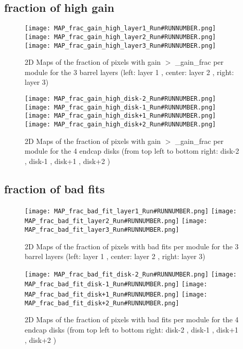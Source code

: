 \documentclass[a4paper,10pt]{article}
\begin{document}
\pagebreak



\subsection{fraction of high gain}

\begin{figure}[htp]
 \centering
\subfigure
 {\texttt{[image: MAP\_frac\_gain\_high\_layer1\_Run\#RUNNUMBER.png]}}
\subfigure
 {\texttt{[image: MAP\_frac\_gain\_high\_layer2\_Run\#RUNNUMBER.png]}}
\subfigure
 {\texttt{[image: MAP\_frac\_gain\_high\_layer3\_Run\#RUNNUMBER.png]}}
\caption{2D Maps of the fraction of pixels with gain $>$ \high_gain_frac per module for the 3 barrel layers (left: layer 1 , center: layer 2 , right: layer 3)}
\end{figure}

\begin{figure}[htp]
 \centering
\subfigure
 {\texttt{[image: MAP\_frac\_gain\_high\_disk-2\_Run\#RUNNUMBER.png]}}
\subfigure
 {\texttt{[image: MAP\_frac\_gain\_high\_disk-1\_Run\#RUNNUMBER.png]}}
\subfigure
 {\texttt{[image: MAP\_frac\_gain\_high\_disk+1\_Run\#RUNNUMBER.png]}}
\subfigure
 {\texttt{[image: MAP\_frac\_gain\_high\_disk+2\_Run\#RUNNUMBER.png]}}
\caption{2D Maps of the fraction of pixels with gain $>$ \high_gain_frac per module for the 4 endcap disks (from top left to bottom right: disk-2 , disk-1 , disk+1 , disk+2 )}
\end{figure}

\pagebreak


\subsection{fraction of bad fits}

\begin{figure}[htp]
 \centering
\subfigure
 {\texttt{[image: MAP\_frac\_bad\_fit\_layer1\_Run\#RUNNUMBER.png]}}
\subfigure
 {\texttt{[image: MAP\_frac\_bad\_fit\_layer2\_Run\#RUNNUMBER.png]}}
\subfigure
 {\texttt{[image: MAP\_frac\_bad\_fit\_layer3\_Run\#RUNNUMBER.png]}}
\caption{2D Maps of the fraction of pixels with bad fits per module for the 3 barrel layers (left: layer 1 , center: layer 2 , right: layer 3)}
\end{figure}

\begin{figure}[htp]
 \centering
\subfigure
 {\texttt{[image: MAP\_frac\_bad\_fit\_disk-2\_Run\#RUNNUMBER.png]}}
\subfigure
 {\texttt{[image: MAP\_frac\_bad\_fit\_disk-1\_Run\#RUNNUMBER.png]}}
\subfigure
 {\texttt{[image: MAP\_frac\_bad\_fit\_disk+1\_Run\#RUNNUMBER.png]}}
\subfigure
 {\texttt{[image: MAP\_frac\_bad\_fit\_disk+2\_Run\#RUNNUMBER.png]}}
\caption{2D Maps of the fraction of pixels with bad fits per module for the 4 endcap disks (from top left to bottom right: disk-2 , disk-1 , disk+1 , disk+2 )}
\end{figure}
\end{document}
